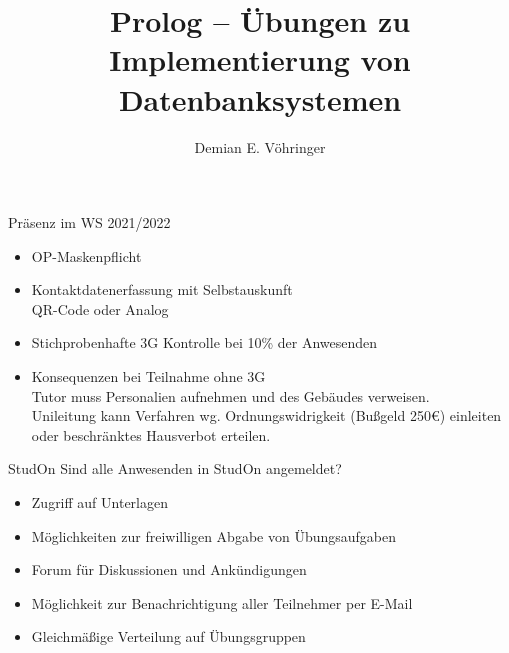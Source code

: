 \title[Prolog -- UeIDB]{Prolog -- Übungen zu \glqq Implementierung von Datenbanksystemen\grqq}
\author{Demian E. Vöhringer}


\maketitle



\begin{frame}{Präsenz im WS 2021/2022}
\Large
\begin{itemize}
	\item OP-Maskenpflicht
	\item Kontaktdatenerfassung mit Selbstauskunft\\
	QR-Code oder Analog
	\item Stichprobenhafte 3G Kontrolle bei 10\% der Anwesenden
	\item Konsequenzen bei Teilnahme ohne 3G\\
	Tutor muss Personalien aufnehmen und des Gebäudes verweisen.\\
	Unileitung kann Verfahren wg. Ordnungswidrigkeit \alert{(Bußgeld 250€)} einleiten oder beschränktes \alert{Hausverbot} erteilen.
\end{itemize}
\end{frame}

\begin{frame}{StudOn}
\Large
Sind alle Anwesenden in StudOn angemeldet?
\begin{itemize}
\item Zugriff auf Unterlagen
\item Möglichkeiten zur freiwilligen Abgabe von Übungsaufgaben
\item Forum für Diskussionen und Ankündigungen
\item Möglichkeit zur Benachrichtigung aller Teilnehmer per E-Mail
\item Gleichmäßige Verteilung auf Übungsgruppen
\end{itemize}
\end{frame}

